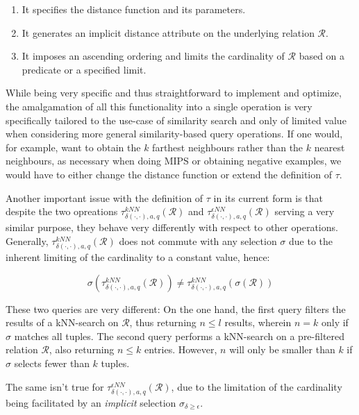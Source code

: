 \begin{enumerate}
    \item It specifies the distance function and its parameters.
    \item It generates an implicit distance attribute on the underlying relation $\mathcal{R}$.
    \item It imposes an ascending ordering and limits the cardinality of $\mathcal{R}$ based on a predicate or a specified limit.
\end{enumerate}

While being very specific and thus straightforward to implement and optimize, the amalgamation of all this functionality into a single operation is very specifically tailored to the use-case of similarity search and only of limited value when considering more general similarity-based query operations. If one would, for example, want to obtain the $k$ farthest neighbours rather than the $k$ nearest neighbours, as necessary when doing MIPS or obtaining negative examples, we would have to either change the distance function or extend the definition of $\tau$. 

Another important issue with the definition of $\tau$ in its current form is that despite the two opreations $\tau^{kNN}_{\delta(\cdot,\cdot),a,q}(\mathcal{R})$ and $\tau^{\epsilon NN}_{\delta(\cdot,\cdot),a,q}(\mathcal{R})$ serving a very similar purpose, they behave very differently with respect to other operations. Generally, $\tau^{kNN}_{\delta(\cdot,\cdot),a,q}(\mathcal{R})$ does not commute with any selection $\sigma$ due to the inherent limiting of the cardinality to a constant value, hence:

\begin{equation}
    \sigma(\tau^{kNN}_{\delta(\cdot,\cdot),a,q}(\mathcal{R})) \neq \tau^{kNN}_{\delta(\cdot,\cdot),a,q}(\sigma(\mathcal{R}))
\end{equation}

These two queries are very different: On the one hand, the first query filters the results of a kNN-search on $\mathcal{R}$, thus returning $n \leq l$ results, wherein $n = k$ only if $\sigma$ matches all tuples. The second query performs a kNN-search on a pre-filtered relation $\mathcal{R}$, also returning $n \leq k$ entries. However, $n$ will only be smaller than $k$ if $\sigma$ selects fewer than $k$ tuples. 

The same isn't true for $\tau^{\epsilon NN}_{\delta(\cdot,\cdot),a,q}(\mathcal{R})$, due to the limitation of the cardinality being facilitated by an \emph{implicit} selection $\sigma_{\delta \geq \epsilon}$.


